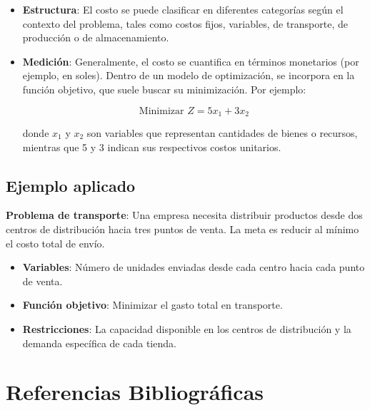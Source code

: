 \documentclass[12pt]{article}
\begin{document}
	\begin{itemize}
		\item \textbf{Estructura}: El costo se puede clasificar en diferentes categorías según el contexto del problema, tales como costos fijos, variables, de transporte, de producción o de almacenamiento.
		
		\item \textbf{Medición}: Generalmente, el costo se cuantifica en términos monetarios (por ejemplo, en soles). Dentro de un modelo de optimización, se incorpora en la función objetivo, que suele buscar su minimización. Por ejemplo:
		
		\[
		\text{Minimizar } Z = 5x_1 + 3x_2
		\]
		
		donde \(x_1\) y \(x_2\) son variables que representan cantidades de bienes o recursos, mientras que 5 y 3 indican sus respectivos costos unitarios.
	\end{itemize}
	
	\subsection*{Ejemplo aplicado}
	
	\textbf{Problema de transporte}: Una empresa necesita distribuir productos desde dos centros de distribución hacia tres puntos de venta. La meta es reducir al mínimo el costo total de envío.
	
	\begin{itemize}
		\item \textbf{Variables}: Número de unidades enviadas desde cada centro hacia cada punto de venta.
		\item \textbf{Función objetivo}: Minimizar el gasto total en transporte.
		\item \textbf{Restricciones}: La capacidad disponible en los centros de distribución y la demanda específica de cada tienda.
	\end{itemize}
	
	\section*{Referencias Bibliográficas}
	
\end{document}
